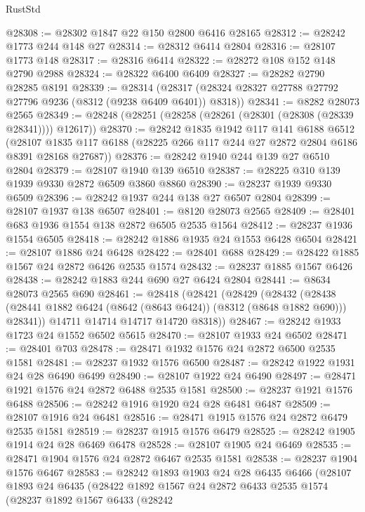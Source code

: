 \begin{lexlean}{RustStd}
\begin{coremodule}
@28308 := @28302 @1847 @22 @150 @2800 @6416 @28165
@28312 := @28242 @1773 @244 @148 @27
@28314 := @28312 @6414 @2804
@28316 := @28107 @1773 @148
@28317 := @28316 @6414
@28322 := @28272 @108 @152 @148 @2790 @2988
@28324 := @28322 @6400 @6409
@28327 := @28282 @2790 @28285 @8191
@28339 := @28314
    (@28317 (@28324 @28327 @27788 @27792 @27796 @9236 (@8312 (@9238 @6409 @6401)) @8318))
@28341 := @8282 @28073 @2565
@28349 := @28248 (@28251 (@28258 (@28261 (@28301 (@28308 (@28339 @28341)))) @12617))
@28370 := @28242
    @1835
    @1942
    @117
    @141
    @6188
    @6512
    (@28107 @1835 @117 @6188 (@28225 @266 @117 @244 @27 @2872 @2804 @6186 @8391 @28168 @27687))
@28376 := @28242 @1940 @244 @139 @27 @6510 @2804
@28379 := @28107 @1940 @139 @6510
@28387 := @28225 @310 @139 @1939 @9330 @2872 @6509 @3860 @8860
@28390 := @28237 @1939 @9330 @6509
@28396 := @28242 @1937 @244 @138 @27 @6507 @2804
@28399 := @28107 @1937 @138 @6507
@28401 := @8120 @28073 @2565
@28409 := @28401 @683 @1936 @1554 @138 @2872 @6505 @2535 @1564
@28412 := @28237 @1936 @1554 @6505
@28418 := @28242 @1886 @1935 @24 @1553 @6428 @6504
@28421 := @28107 @1886 @24 @6428
@28422 := @28401 @688
@28429 := @28422 @1885 @1567 @24 @2872 @6426 @2535 @1574
@28432 := @28237 @1885 @1567 @6426
@28438 := @28242 @1883 @244 @690 @27 @6424 @2804
@28441 := @8634 @28073 @2565 @690
@28461 := @28418
    (@28421
      (@28429
        (@28432
          (@28438 (@28441 @1882 @6424 (@8642 (@8643 @6424)) (@8312 (@8648 @1882 @690))) @28341))
        @14711
        @14714
        @14717
        @14720
        @8318))
@28467 := @28242 @1933 @1723 @24 @1552 @6502 @5615
@28470 := @28107 @1933 @24 @6502
@28471 := @28401 @703
@28478 := @28471 @1932 @1576 @24 @2872 @6500 @2535 @1581
@28481 := @28237 @1932 @1576 @6500
@28487 := @28242 @1922 @1931 @24 @28 @6490 @6499
@28490 := @28107 @1922 @24 @6490
@28497 := @28471 @1921 @1576 @24 @2872 @6488 @2535 @1581
@28500 := @28237 @1921 @1576 @6488
@28506 := @28242 @1916 @1920 @24 @28 @6481 @6487
@28509 := @28107 @1916 @24 @6481
@28516 := @28471 @1915 @1576 @24 @2872 @6479 @2535 @1581
@28519 := @28237 @1915 @1576 @6479
@28525 := @28242 @1905 @1914 @24 @28 @6469 @6478
@28528 := @28107 @1905 @24 @6469
@28535 := @28471 @1904 @1576 @24 @2872 @6467 @2535 @1581
@28538 := @28237 @1904 @1576 @6467
@28583 := @28242
    @1893
    @1903
    @24
    @28
    @6435
    @6466
    (@28107
      @1893
      @24
      @6435
      (@28422
        @1892
        @1567
        @24
        @2872
        @6433
        @2535
        @1574
        (@28237
          @1892
          @1567
          @6433
          (@28242

\end{coremodule}
\end{lexlean}
